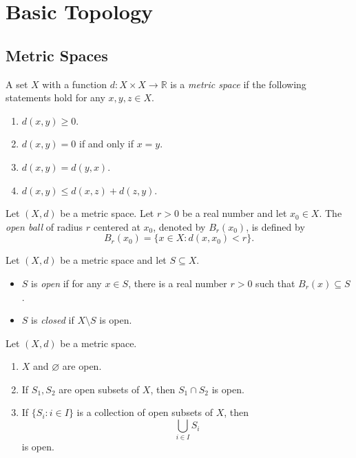 \chapter{Basic Topology}
\section{Metric Spaces}
\begin{definition}
  A set $X$ with a function $d: X \times X \to \mathbb{R}$ is a
  \emph{metric space} if the following statements hold for any $x, y, z \in X$.
  \begin{enumerate}
    \item $d(x, y) \geq 0$.
    \item $d(x, y) = 0$ if and only if $x = y$.
    \item $d(x, y) = d(y, x)$.
    \item $d(x, y) \leq d(x, z) + d(z, y)$.
  \end{enumerate}
\end{definition}

\begin{definition}
  Let $(X, d)$ be a metric space.
  Let $r > 0$ be a real number and let $x_0 \in X$.
  The \emph{open ball} of radius $r$ centered at $x_0$, denoted by $B_r(x_0)$,
  is defined by
  \begin{equation*}
    B_r(x_0) = \{x \in X: d(x, x_0) < r\}.
  \end{equation*}
\end{definition}

\begin{definition}
  Let $(X, d)$ be a metric space and let $S \subseteq X$.
  \begin{itemize}
    \item $S$ is \emph{open} if for any $x \in S$, there is a real number
    $r > 0$ such that $B_r(x) \subseteq S$.
    \item $S$ is \emph{closed} if $X \setminus S$ is open.
  \end{itemize}
\end{definition}

\begin{theorem}
  Let $(X, d)$ be a metric space.
  \begin{enumerate}
    \item $X$ and $\varnothing$ are open.
    \item If $S_1, S_2$ are open subsets of $X$, then $S_1 \cap S_2$ is open.
    \item If $\{S_i: i \in I\}$ is a collection of open subsets of $X$, then
    \begin{equation*}
      \bigcup_{i \in I} S_i
    \end{equation*}
    is open.
  \end{enumerate}
\end{theorem}

